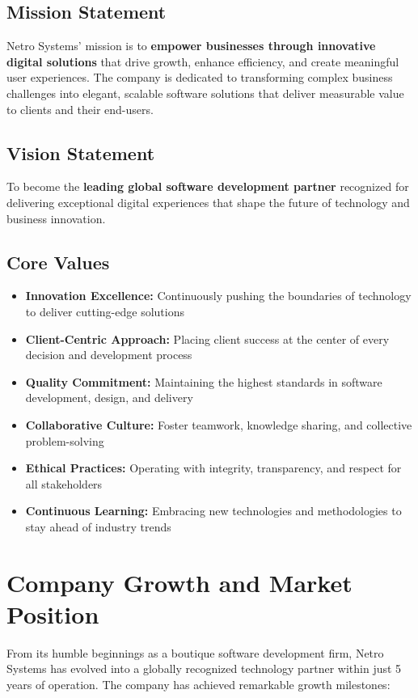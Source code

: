 \documentclass[12pt,a4paper]{report}
\newcommand{\skill}[1]{\textcolor{skillcolor}{\textbf{#1}}}
\newenvironment{coloritemize}
{\begin{itemize}[label=\textcolor{primaryblue}{$\bullet$}]}
{\end{itemize}}
\begin{document}
\subsection{Mission Statement}
Netro Systems' mission is to \textbf{empower businesses through innovative digital solutions} that drive growth, enhance efficiency, and create meaningful user experiences. The company is dedicated to transforming complex business challenges into elegant, scalable software solutions that deliver measurable value to clients and their end-users.

\subsection{Vision Statement}
To become the \textbf{leading global software development partner} recognized for delivering exceptional digital experiences that shape the future of technology and business innovation.

\subsection{Core Values}
\begin{coloritemize}
    \item \skill{Innovation Excellence:} Continuously pushing the boundaries of technology to deliver cutting-edge solutions
    \item \skill{Client-Centric Approach:} Placing client success at the center of every decision and development process
    \item \skill{Quality Commitment:} Maintaining the highest standards in software development, design, and delivery
    \item \skill{Collaborative Culture:} Foster teamwork, knowledge sharing, and collective problem-solving
    \item \skill{Ethical Practices:} Operating with integrity, transparency, and respect for all stakeholders
    \item \skill{Continuous Learning:} Embracing new technologies and methodologies to stay ahead of industry trends
\end{coloritemize}

\section{Company Growth and Market Position}
From its humble beginnings as a boutique software development firm, Netro Systems has evolved into a globally recognized technology partner within just 5 years of operation. The company has achieved remarkable growth milestones:
\end{document}
